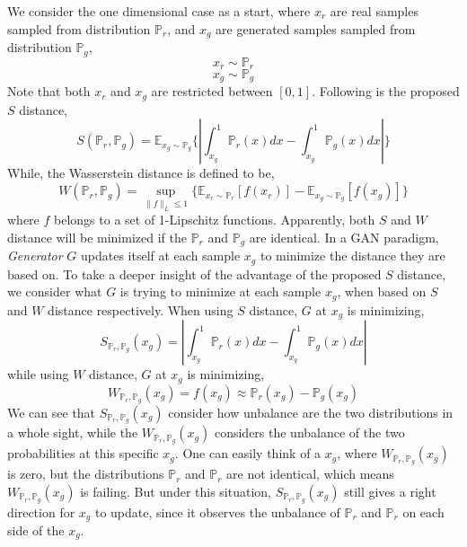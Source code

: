 \documentclass[letterpaper]{article} %
\begin{document}
We consider the one dimensional case as a start, where $x_{r}$ are real samples sampled from distribution $\mathbb{P}_{r}$, and $x_{g}$ are generated samples sampled from distribution $\mathbb{P}_{g}$,
\begin{equation}\label{x-r}
   x_{r} \sim \mathbb{P}_{r}
\end{equation}
\begin{equation}\label{x-g}
  x_{g} \sim \mathbb{P}_{g}
\end{equation}
Note that both $x_{r}$ and $x_{g}$ are restricted between $[0,1]$. Following is the proposed $S$ distance,
\begin{equation}\label{s-distance}
  S(\mathbb{P}_r,\mathbb{P}_g)=\mathbb{E}_{x_g \sim \mathbb{P}_g} \{ | \int_{x_g}^{1} \mathbb{P}_r(x) d x - \int_{x_g}^{1} \mathbb{P}_g(x) d x | \}
\end{equation}
While, the Wasserstein distance is defined to be,
\begin{equation}\label{w-distance}
  W(\mathbb{P}_r,\mathbb{P}_g)=\sup_{\|f\|_L \leq 1} \{ \mathbb{E}_{x_r \sim \mathbb{P}_r} [f(x_r)] - \mathbb{E}_{x_g \sim \mathbb{P}_g} [f(x_g)] \}
\end{equation}
where $f$ belongs to a set of 1-Lipschitz functions.
Apparently, both $S$ and $W$ distance will be minimized if the $\mathbb{P}_r$ and $\mathbb{P}_g$ are identical.
In a GAN paradigm, \textit{Generator} $G$ updates itself at each sample $x_g$ to minimize the distance they are based on.
To take a deeper insight of the advantage of the proposed $S$ distance, we consider what $G$ is trying to minimize at each sample $x_g$, when based on $S$ and $W$ distance respectively.
When using $S$ distance, $G$ at $x_g$ is minimizing,
\begin{equation}\label{s-distance-at-xg}
  S_{\mathbb{P}_r,\mathbb{P}_g}(x_g)= | \int_{x_g}^{1} \mathbb{P}_r(x) d x - \int_{x_g}^{1} \mathbb{P}_g(x) d x |
\end{equation}
while using $W$ distance, $G$ at $x_g$ is minimizing,
\begin{equation}\label{w-distance-xg}
  W_{\mathbb{P}_r,\mathbb{P}_g}(x_g) = f(x_g) \approx \mathbb{P}_r(x_g) - \mathbb{P}_g(x_g)
\end{equation}
We can see that $S_{\mathbb{P}_r,\mathbb{P}_g}(x_g)$ consider how unbalance are the two distributions in a whole sight, while the $W_{\mathbb{P}_r,\mathbb{P}_g}(x_g)$ considers the unbalance of the two probabilities at this specific $x_g$. One can easily think of a $x_g$, where $W_{\mathbb{P}_r,\mathbb{P}_g}(x_g)$ is zero, but the distributions $\mathbb{P}_r$ and $\mathbb{P}_r$ are not identical, which means $W_{\mathbb{P}_r,\mathbb{P}_g}(x_g)$ is failing. But under this situation, $S_{\mathbb{P}_r,\mathbb{P}_g}(x_g)$ still gives a right direction for $x_g$ to update, since it observes the unbalance of $\mathbb{P}_r$ and $\mathbb{P}_r$ on each side of the $x_g$.
\end{document}
